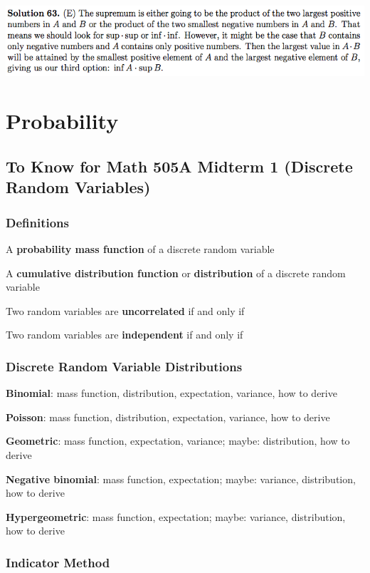 \documentclass{article}
\begin{document}
\includegraphics[scale=0.65]{1268_63s}

\pagebreak


\section{Probability}

\subsection{To Know for Math 505A Midterm 1 (Discrete Random Variables)}

\subsubsection{Definitions}

A \textbf{probability mass function} of a discrete random variable

A \textbf{cumulative distribution function} or \textbf{distribution} of a discrete random variable

Two random variables are \textbf{uncorrelated} if and only if

Two random variables are \textbf{independent} if and only if

\subsubsection{Discrete Random Variable Distributions}

\textbf{Binomial}: mass function, distribution, expectation, variance, how to derive

\textbf{Poisson}: mass function, distribution, expectation, variance, how to derive

\textbf{Geometric}: mass function, expectation, variance; maybe: distribution, how to derive

\textbf{Negative binomial}: mass function, expectation; maybe: variance, distribution, how to derive

\textbf{Hypergeometric}: mass function, expectation; maybe: variance, distribution, how to derive

\subsubsection{Indicator Method}
\end{document}

